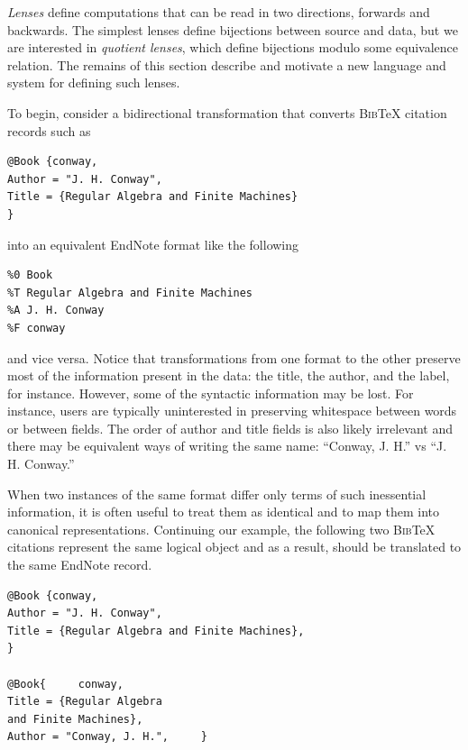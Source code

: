 \documentclass[acmsmall,review,anonymous]{acmart}\settopmatter{printfolios=true,printccs=false,printacmref=false}
\newcommand{\bibtex}{\textsc{Bib}\TeX{}}
\begin{document}

\emph{Lenses} define computations that can be read in two directions, forwards and
backwards.  The simplest lenses define bijections between source and
data, but we are interested in \emph{quotient lenses}, which define
bijections modulo some equivalence relation.  The remains of this section
describe and motivate a new language and system for defining such lenses.

To begin, consider a bidirectional transformation that converts
\bibtex{} citation records such as
\begin{verbatim}
@Book {conway,
Author = "J. H. Conway",
Title = {Regular Algebra and Finite Machines}
}
\end{verbatim}
\noindent
into an equivalent EndNote format like the following
\begin{verbatim}
%0 Book
%T Regular Algebra and Finite Machines
%A J. H. Conway
%F conway
\end{verbatim}
\noindent
and vice versa.
%
Notice that transformations from one format to the other preserve
most of the information present in the data:  the title, the author,
and the label, for instance.  However, some of the syntactic information
may be lost.  For instance, users are typically uninterested in preserving
whitespace between words or
between fields.  The order of author and title fields is also likely
irrelevant and there may be equivalent ways of writing the same
name:  ``Conway, J. H.'' vs ``J. H. Conway.''


When two instances of the same format differ only terms of such inessential
information, it is often useful to treat them as identical and to map them
into canonical representations.
Continuing our example, the following two
\bibtex{} citations represent the same logical object and as a result, should
be translated to the same EndNote record.
\begin{verbatim}
@Book {conway,
Author = "J. H. Conway",
Title = {Regular Algebra and Finite Machines},
}

@Book{     conway,
Title = {Regular Algebra
and Finite Machines},
Author = "Conway, J. H.",     }
\end{verbatim}
\end{document}
